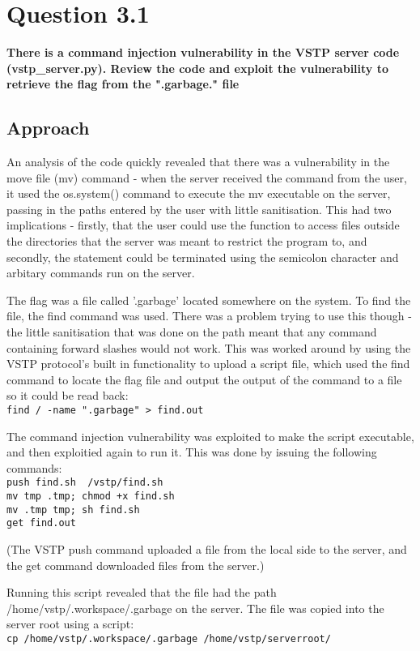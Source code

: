 \section{Question 3.1}
\textbf{There is a command injection vulnerability in the VSTP server code
(vstp\_server.py). Review the code and exploit the vulnerability to retrieve the
flag from the ".garbage." file}
\subsection{Approach}
An analysis of the code quickly revealed that there was a vulnerability in the
move file (mv) command - when the server received the command from the user,
it used the os.system() command to execute the mv executable on the server,
passing in the paths entered by the user with little sanitisation. This had
two implications - firstly, that the user could use the function to access
files outside the directories that the server was meant to restrict the
program to, and secondly, the statement could be terminated using the
semicolon character and arbitary commands run on the server.

The flag was a file called '.garbage' located somewhere on the system. To find
the file, the find command was used. There was a problem trying to use this
though - the little sanitisation that was done on the path meant that any
command containing forward slashes would not work. This was worked around
by using the VSTP protocol's built in functionality to upload a script file,
which used the find command to locate the flag file and output the output of
the command to a file so it could be read back:
\\
\texttt{find / -name ".garbage" > find.out}

The command injection vulnerability was exploited to make the script 
executable, and then exploitied again to run it. This was done by issuing
the following commands:
\\
\texttt{push find.sh ~/vstp/find.sh}
\\
\texttt{mv tmp .tmp; chmod +x find.sh}
\\
\texttt{mv .tmp tmp; sh find.sh}
\\
\texttt{get find.out}

(The VSTP push command uploaded a file from the local side to the server, and
the get command downloaded files from the server.)

Running this script revealed that the file had the path
/home/vstp/.workspace/.garbage on the server. The file was copied into the
server root using a script:
\\
\texttt{cp /home/vstp/.workspace/.garbage /home/vstp/serverroot/}

